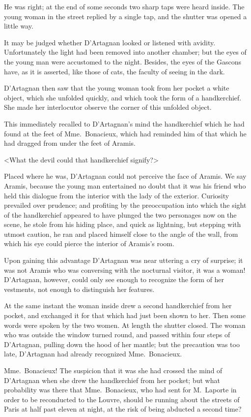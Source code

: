 He was right; at the end of some seconds two sharp taps were heard inside. The young woman in the street replied by a single tap, and the shutter was opened a little way. 

It may be judged whether D'Artagnan looked or listened with avidity. Unfortunately the light had been removed into another chamber; but the eyes of the young man were accustomed to the night. Besides, the eyes of the Gascons have, as it is asserted, like those of cats, the faculty of seeing in the dark. 

D'Artagnan then saw that the young woman took from her pocket a white object, which she unfolded quickly, and which took the form of a handkerchief. She made her interlocutor observe the corner of this unfolded object. 

This immediately recalled to D'Artagnan's mind the handkerchief which he had found at the feet of Mme.~Bonacieux, which had reminded him of that which he had dragged from under the feet of Aramis. 

<What the devil could that handkerchief signify?> 

Placed where he was, D'Artagnan could not perceive the face of Aramis. We say Aramis, because the young man entertained no doubt that it was his friend who held this dialogue from the interior with the lady of the exterior. Curiosity prevailed over prudence; and profiting by the preoccupation into which the sight of the handkerchief appeared to have plunged the two personages now on the scene, he stole from his hiding place, and quick as lightning, but stepping with utmost caution, he ran and placed himself close to the angle of the wall, from which his eye could pierce the interior of Aramis's room. 

Upon gaining this advantage D'Artagnan was near uttering a cry of surprise; it was not Aramis who was conversing with the nocturnal visitor, it was a woman! D'Artagnan, however, could only see enough to recognize the form of her vestments, not enough to distinguish her features. 

At the same instant the woman inside drew a second handkerchief from her pocket, and exchanged it for that which had just been shown to her. Then some words were spoken by the two women. At length the shutter closed. The woman who was outside the window turned round, and passed within four steps of D'Artagnan, pulling down the hood of her mantle; but the precaution was too late, D'Artagnan had already recognized Mme.~Bonacieux. 

Mme.~Bonacieux! The suspicion that it was she had crossed the mind of D'Artagnan when she drew the handkerchief from her pocket; but what probability was there that Mme.~Bonacieux, who had sent for M.~Laporte in order to be reconducted to the Louvre, should be running about the streets of Paris at half past eleven at night, at the risk of being abducted a second time? 

